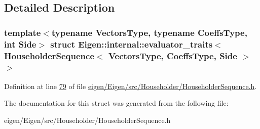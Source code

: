 \subsection{Detailed Description}
\subsubsection*{template$<$typename Vectors\+Type, typename Coeffs\+Type, int Side$>$\newline
struct Eigen\+::internal\+::evaluator\+\_\+traits$<$ Householder\+Sequence$<$ Vectors\+Type, Coeffs\+Type, Side $>$ $>$}



Definition at line \hyperlink{eigen_2_eigen_2src_2_householder_2_householder_sequence_8h_source_l00079}{79} of file \hyperlink{eigen_2_eigen_2src_2_householder_2_householder_sequence_8h_source}{eigen/\+Eigen/src/\+Householder/\+Householder\+Sequence.\+h}.



The documentation for this struct was generated from the following file\+:\begin{DoxyCompactItemize}
\item 
eigen/\+Eigen/src/\+Householder/\+Householder\+Sequence.\+h\end{DoxyCompactItemize}
